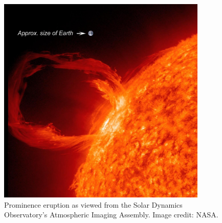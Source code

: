 \begin{figure}[!h]
    \begin{center}
	    \includegraphics[width=100mm]{Images/ProminenceEruption.png}
    \end{center}
    \caption[Prominence eruption]{
        Prominence eruption as viewed from the Solar Dynamics Observatory's Atmospheric Imaging Assembly. Image credit:
        NASA. 
    }
    \label{fig:prominenceeruption}
\end{figure}

